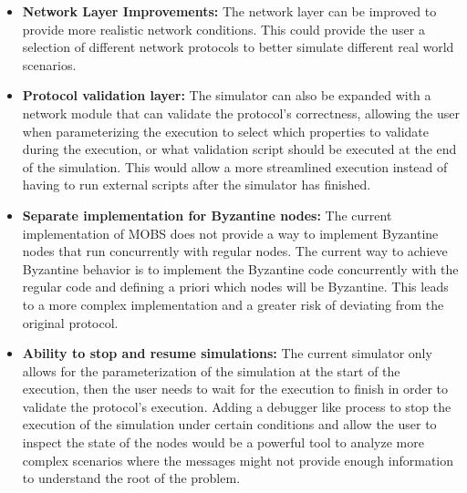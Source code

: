 \begin{itemize}
    \item \textbf{Network Layer Improvements:} The network layer can be improved to
    provide more realistic network conditions. This could provide the user a selection
    of different network protocols to better simulate different real world scenarios.

    \item \textbf{Protocol validation layer:} The simulator can also be expanded with a network
    module that can validate the protocol's correctness, allowing the user when parameterizing
    the execution to select which properties to validate during the execution, or what validation
    script should be executed at the end of the simulation. This would allow a more streamlined
    execution instead of having to run external scripts after the simulator has finished.

    \item \textbf{Separate implementation for Byzantine nodes:} The current implementation
    of MOBS does not provide a way to implement Byzantine nodes that run concurrently with
    regular nodes. The current way to achieve Byzantine behavior is to implement the Byzantine
    code concurrently with the regular code and defining a priori which nodes will be Byzantine.
    This leads to a more complex implementation and a greater risk of deviating from the
    original protocol.

    \item \textbf{Ability to stop and resume simulations:} The current simulator only allows
    for the parameterization of the simulation at the start of the execution, then the user needs
    to wait for the execution to finish in order to validate the protocol's execution. Adding a
    debugger like process to stop the execution of the simulation under certain conditions and allow
    the user to inspect the state of the nodes would be a powerful tool to analyze more complex scenarios
    where the messages might not provide enough information to understand the root of the problem.
\end{itemize}

